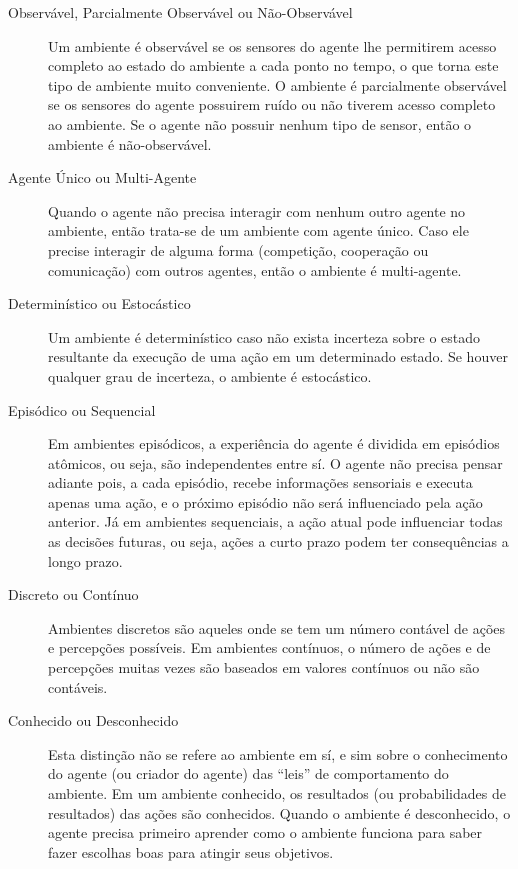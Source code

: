 \begin{description}
	\item[Observável, Parcialmente Observável ou Não-Observável]
		Um ambiente é observável se os sensores do agente lhe permitirem acesso
		completo ao estado do ambiente a cada ponto no tempo, o que torna este
		tipo de ambiente muito conveniente. O ambiente é parcialmente observável
		se os sensores do agente possuirem ruído ou não tiverem acesso completo
		ao ambiente. Se o agente não possuir nenhum tipo de sensor, então o
		ambiente é não-observável.

	\item[Agente Único ou Multi-Agente]
		Quando o agente não precisa interagir com nenhum outro agente no
		ambiente, então trata-se de um ambiente com agente único. Caso ele
		precise interagir de alguma forma (competição, cooperação ou
		comunicação) com outros agentes, então o ambiente é multi-agente.

	\item[Determinístico ou Estocástico]
		Um ambiente é determinístico caso não exista incerteza sobre o estado
		resultante da execução de uma ação em um determinado estado. Se houver
		qualquer grau de incerteza, o ambiente é estocástico.

	\item[Episódico ou Sequencial]
		Em ambientes episódicos, a experiência do agente é dividida em episódios
		atômicos, ou seja, são independentes entre sí. O agente não precisa
		pensar adiante pois, a cada episódio, recebe informações sensoriais e
		executa apenas uma ação, e o próximo episódio não será influenciado pela
		ação anterior. Já em ambientes sequenciais, a ação atual pode
		influenciar todas as decisões futuras, ou seja, ações a curto prazo
		podem ter consequências a longo prazo.

	\item[Discreto ou Contínuo]
		Ambientes discretos são aqueles onde se tem um número contável de ações
		e percepções possíveis. Em ambientes contínuos, o número de ações e de
		percepções muitas vezes são baseados em valores contínuos ou não são
		contáveis.

	\item[Conhecido ou Desconhecido]
		Esta distinção não se refere ao ambiente em sí, e sim sobre o
		conhecimento do agente (ou criador do agente) das ``leis'' de
		comportamento do ambiente. Em um ambiente conhecido, os resultados (ou
		probabilidades de resultados) das ações são conhecidos. Quando o
		ambiente é desconhecido, o agente precisa primeiro aprender como o
		ambiente funciona para saber fazer escolhas boas para atingir seus
		objetivos.
\end{description}


